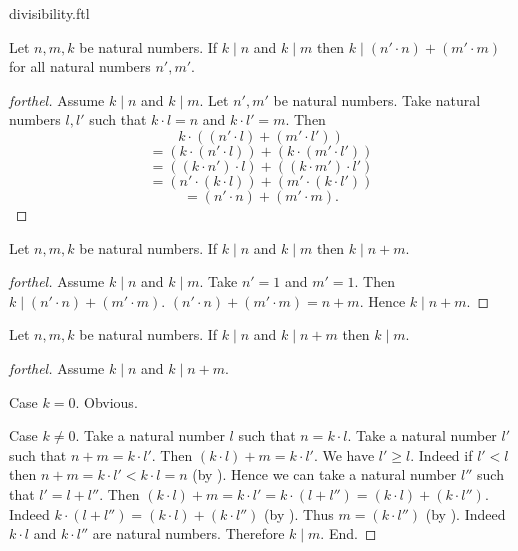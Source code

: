 \documentclass{naproche-library}
\begin{document}
\begin{smodule}{divisibility.ftl}
  \begin{proposition}[forthel,id=ARITHMETIC_07_4700711333920768]
    Let $n, m, k$ be natural numbers.
    If $k \mid n$ and $k \mid m$ then $k \mid (n' \cdot n) + (m' \cdot m)$
    for all natural numbers $n', m'$.
  \end{proposition}
  \begin{proof}[forthel]
    Assume $k \mid n$ and $k \mid m$.
    Let $n', m'$ be natural numbers.
    Take natural numbers $l,l'$ such that $k \cdot l = n$ and $k \cdot l' = m$.
    Then
    \[  k \cdot ((n' \cdot l) + (m' \cdot l'))                \]
    \[    = (k \cdot (n' \cdot l)) + (k \cdot (m' \cdot l'))  \]
    \[    = ((k \cdot n') \cdot l) + ((k \cdot m') \cdot l')  \]
    \[    = (n' \cdot (k \cdot l)) + (m' \cdot (k \cdot l'))  \]
    \[    = (n' \cdot n) + (m' \cdot m).                      \]
  \end{proof}

  \begin{corollary}[forthel,id=ARITHMETIC_07_1556786209357824]
    Let $n, m, k$ be natural numbers.
    If $k \mid n$ and $k \mid m$ then $k \mid n + m$.
  \end{corollary}
  \begin{proof}[forthel]
    Assume $k \mid n$ and $k \mid m$.
    Take $n' = 1$ and $m' = 1$.
    Then $k \mid (n' \cdot n) + (m' \cdot m)$.
    $(n' \cdot n) + (m' \cdot m) = n + m$.
    Hence $k \mid n + m$.
  \end{proof}

  \begin{proposition}[forthel,id=ARITHMETIC_07_1076947887063040]
    Let $n, m, k$ be natural numbers.
    If $k \mid n$ and $k \mid n + m$ then $k \mid m$.
  \end{proposition}
  \begin{proof}[forthel]
    Assume $k \mid n$ and $k \mid n + m$.

    Case $k = 0$. Obvious.

    Case $k \neq 0$.
      Take a natural number $l$ such that $n = k \cdot l$.
      Take a natural number $l'$ such that $n + m = k \cdot l'$.
      Then $(k \cdot l) + m = k \cdot l'$.
      We have $l' \geq l$.
      Indeed if $l' < l$ then
      $n + m
        = k \cdot l'
        < k \cdot l
        = n$ (by ).
      Hence we can take a natural number $l''$ such that $l' = l + l''$.
      Then $(k \cdot l) + m
        = k \cdot l'
        = k \cdot (l + l'')
        = (k \cdot l) + (k \cdot l'')$.
      Indeed $k \cdot (l + l'') = (k \cdot l) + (k \cdot l'')$ (by ).
      Thus $m = (k \cdot l'')$ (by ).
      Indeed $k \cdot l$ and $k \cdot l''$ are natural numbers.
      Therefore $k \mid m$.
    End.
  \end{proof}


\end{smodule}
\end{document}
